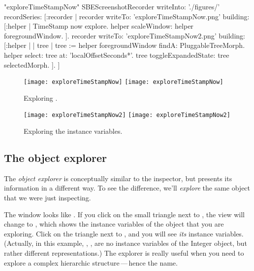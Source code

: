 \documentclass[a4paper,10pt,twoside]{book}
\begin{document}
\begin{ExecuteSmalltalkScript}"exploreTimeStampNow"
SBEScreenshotRecorder writeInto: './figures/' recordSeries: [:recorder |
	recorder writeTo: 'exploreTimeStampNow.png' building: [:helper |
		TimeStamp now explore.
		helper scaleWindow: helper foregroundWindow.
	].
	recorder writeTo: 'exploreTimeStampNow2.png' building: [:helper |
		| tree |
		tree := helper foregroundWindow findA: PluggableTreeMorph.
		helper
			select: tree
			at: 'localOffsetSeconds*'.
		tree toggleExpandedState: tree selectedMorph.
	].
]
\end{ExecuteSmalltalkScript}
\begin{figure}[tbp]
\begin{minipage}[t]{0.48\textwidth}
	\begin{center}
	\ifluluelse
		{\texttt{[image: exploreTimeStampNow]}}
		{\texttt{[image: exploreTimeStampNow]}}
	\end{center}
	\caption{Exploring .}
	\label{fig:exploreTimeStampNow}
\end{minipage}
\hfill
\begin{minipage}[t]{0.48\textwidth}
	\begin{center}
	\ifluluelse
		{\texttt{[image: exploreTimeStampNow2]}}
		{\texttt{[image: exploreTimeStampNow2]}}
	\end{center}
	\caption{Exploring the instance variables.}
	\label{fig:exploreTimeStampNow2}
\end{minipage}
\end{figure}

\subsection{The object explorer}

The \emph{object explorer} is conceptually similar to the inspector, but presents its information in a different way.
To see the difference, we'll \emph{explore} the same object that we were just inspecting.

The  window looks like .
If you click on the small triangle next to , the view will change to , which shows the instance variables of the object that you are exploring.
Click on the triangle next to , and you will see \emph{its} instance variables. (Actually, in this example, , , \etc are no instance variables of the Integer object, but rather different representations.)
The explorer is really useful when you need to explore a complex hierarchic structure\,---\,hence the name.
\end{document}

